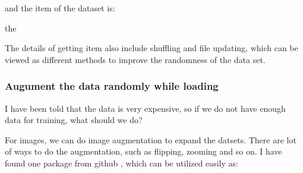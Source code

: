 \documentclass[letterpaper,10pt,english]{sphinxmanual}
\begin{document}
and the item of the dataset is:

%
\begin{sphinxVerbatim}[commandchars=\\\{\}]
  

      \PYG{p}{[}\PYG{p}{]}
\end{sphinxVerbatim}

the 

The details of getting item also include shuffling and file updating, which can be viewed as different methods to improve the randomness of the data set.


\subsubsection{Augument the data randomly while loading}
\label{\detokenize{usage/data:augument-the-data-randomly-while-loading}}
I have been told that the data is very expensive, so if we do not have enough data for training, what should we do?

For images, we can do image augmentation to expand the datsets. There are lot of ways to do the augmentation, such as flipping, zooming and so on. I have found one package from github  , which can be utilized easily as:
\end{document}
